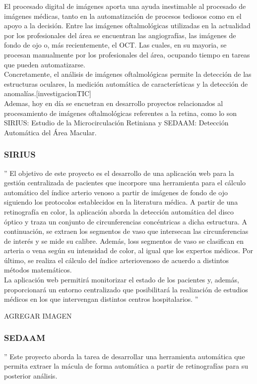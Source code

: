 \documentclass[14pt]{article}
\begin{document}
El procesado digital de imágenes aporta una ayuda inestimable al procesado de imágenes médicas, tanto en la automatización de procesos tediosos como en el apoyo a la decisión. Entre las imágenes oftalmológicas utilizadas en la actualidad por los profesionales del área se encuentran las angiografías, las imágenes de fondo de ojo o, más recientemente, el OCT. Las cuales, en su mayoria, se procesan manualmente por los profesionales del área, ocupando tiempo en tareas que pueden automatizarse.\\[0.5cm] Concretamente, el análisis de imágenes oftalmológicas permite la detección de las estructuras oculares, la medición automática de características y la detección de anomalías.[investigacionTIC]\\[0.5cm]
Ademas, hoy en día se encuetran en desarrollo proyectos relacionados al procesamiento de imágenes oftalmológicas referentes a la retina, como lo son  SIRIUS: Estudio de la Microcirculación Retiniana y SEDAAM: Detección Automática del Área Macular.

\subsubsection{SIRIUS}

'' El objetivo de este proyecto es el desarrollo de una aplicación web para la gestión centralizada de pacientes que incorpore una herramienta para el cálculo automático del índice arterio venoso a partir de imágenes de fondo de ojo siguiendo los protocolos establecidos en la literatura médica. A partir de una retinografía en color, la aplicación aborda la detección automática del disco óptico y traza un conjunto de circunferencias concéntricas a dicha estructura. A continuación, se extraen los segmentos de vaso que intersecan las circunferencias de interés y se mide su calibre. Además, loss segmentos de vaso se clasifican en arteria o vena según su intensidad de color, al igual que los expertos médicos. Por último, se realiza el cálculo del índice arteriovenoso de acuerdo a distintos métodos matemáticos.\\

La aplicación web permitirá monitorizar el estado de los pacientes y, además, proporcionará un entorno centralizado que posibilitará la realización de estudios médicos en los que intervengan distintos centros hospitalarios.   '' \cite{Sirius}

AGREGAR IMAGEN


\subsubsection{SEDAAM}
'' Este proyecto aborda la tarea de desarrollar una herramienta automática que permita extraer la mácula de forma automática a partir de retinografías para su posterior análisis.\\
\end{document}
